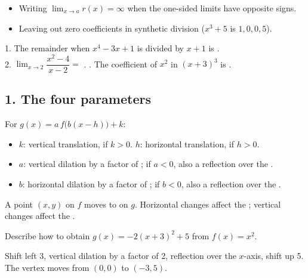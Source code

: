 \begin{mistakes}
\begin{itemize}
\item Writing $\lim_{x\to a}r(x)=\infty$ when the one-sided limits have opposite signs.
\item Leaving out zero coefficients in synthetic division ($x^3+5$ is $1,0,0,5$).
\end{itemize}
\end{mistakes}

\begin{quickcheck}
1. The remainder when $x^4-3x+1$ is divided by $x+1$ is .\\
2. $\lim_{x\to2}\dfrac{x^2-4}{x-2}=$ . . The coefficient of $x^2$ in $(x+3)^3$ is .
\end{quickcheck}


\subsection*{1. The four parameters}
\begin{keyidea}
For $g(x)=a\,f\big(b(x-h)\big)+k$:
\begin{itemize}
\item $k$: vertical translation,  if $k>0$. \quad $h$: horizontal translation,  if $h>0$.
\item $a$: vertical dilation by a factor of ; if $a<0$, also a reflection over the .
\item $b$: horizontal dilation by a factor of ; if $b<0$, also a reflection over the .
\end{itemize}
A point $(x,y)$ on $f$ moves to  on $g$. Horizontal changes affect the ; vertical changes affect the .
\end{keyidea}

Describe how to obtain $g(x)=-2(x+3)^2+5$ from $f(x)=x^2$.
\begin{workspace}[2.2cm]
Shift left 3, vertical dilation by a factor of 2, reflection over the $x$-axis, shift up 5. The vertex moves from $(0,0)$ to $(-3,5)$.
\end{workspace}

